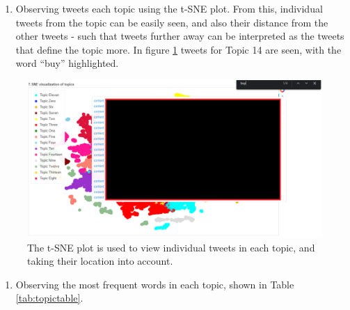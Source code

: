 \documentclass[
]{article}
\providecommand{\tightlist}{%
  \setlength{\itemsep}{0pt}\setlength{\parskip}{0pt}}
\begin{document}
\begin{enumerate}
\def\labelenumi{\arabic{enumi}.}
\setcounter{enumi}{1}
\tightlist
\item
  Observing tweets each topic using the t-SNE plot. From this,
  individual tweets from the topic can be easily seen, and also their
  distance from the other tweets - such that tweets further away can be
  interpreted as the tweets that define the topic more. In figure
  \ref{fig:tsne2} tweets for Topic 14 are seen, with the word ``buy''
  highlighted.
\end{enumerate}

\begin{figure}

{\centering \includegraphics[width=1\linewidth]{images/tsne2} 

}

\caption{The t-SNE plot is used to view individual tweets in each topic, and taking their location into account. }\label{fig:tsne2}
\end{figure}

\begin{enumerate}
\def\labelenumi{\arabic{enumi}.}
\setcounter{enumi}{2}
\tightlist
\item
  Observing the most frequent words in each topic, shown in Table
  \ref{tab:topictable}.
\end{enumerate}
\end{document}
